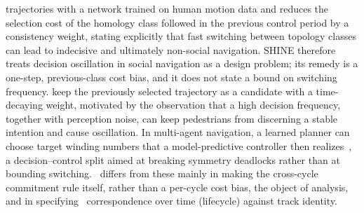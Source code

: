 trajectories with a network trained on human motion data and reduces the selection cost of the homology class followed in the previous control period by a consistency weight, stating explicitly that fast switching between topology classes can lead to indecisive and ultimately non-social navigation. SHINE therefore treats decision oscillation in social navigation as a design problem; its remedy is a one-step, previous-class cost bias, and it does not state a bound on switching frequency. \citet{zhou2023minimally} keep the previously selected trajectory as a candidate with a time-decaying weight, motivated by the observation that a high decision frequency, together with perception noise, can keep pedestrians from discerning a stable intention and cause oscillation. In multi-agent navigation, a learned planner can choose target winding numbers that a model-predictive controller then realizes~\citep{nakao2025wnummpc}, a decision--control split aimed at breaking symmetry deadlocks rather than at bounding switching. \sname\ differs from these mainly in making the cross-cycle commitment rule itself, rather than a per-cycle cost bias, the object of analysis, and in specifying \Class\ correspondence over time (lifecycle) against track identity.

